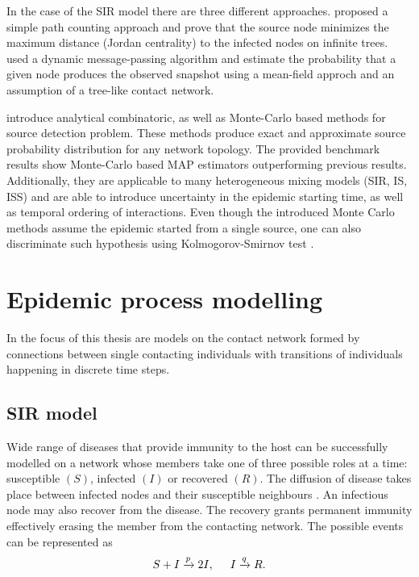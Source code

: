 \documentclass[times, utf8, diplomski]{fer}
\begin{document}
In the case of the SIR model there are three different approaches. \citet{Zhu} proposed a simple path counting approach and prove that the source node minimizes the maximum distance (Jordan centrality) to the infected nodes on infinite trees. \citet{Lohkov} used a dynamic message-passing algorithm and estimate the probability that a given node produces the observed snapshot using a mean-field approch and an assumption of a tree-like contact network.

\citet{Nino} introduce analytical combinatoric, as well as Monte-Carlo based methods for source detection problem. These methods produce exact and approximate source probability distribution for any network topology. The provided benchmark results show Monte-Carlo based MAP estimators outperforming previous results. Additionally, they are applicable to many heterogeneous mixing models (SIR, IS, ISS) and are able to introduce uncertainty in the epidemic starting time, as well as temporal ordering of interactions. 
Even though the introduced Monte Carlo methods assume the epidemic started from a single source, one can also discriminate such hypothesis using Kolmogorov-Smirnov test \cite{Nino}.


\chapter{Epidemic process modelling}

In the focus of this thesis are models on the contact network formed by connections between single contacting individuals with transitions of individuals happening in discrete time steps.

\section{SIR model}
Wide range of diseases that provide immunity to the host can be successfully modelled on a network whose members take 	one of three possible roles at a time: susceptible $(S)$, infected $(I)$ or recovered $(R)$. The diffusion of disease takes place between infected nodes and their susceptible neighbours . An infectious node may also recover from the disease. The recovery grants permanent immunity effectively erasing the member from the contacting network.  The possible events can be represented as 
\begin{equation}
S + I \xrightarrow{p} 2I,\hspace{5mm}  I \xrightarrow{q} R.
\label{transitionsSIR}
\end{equation}
\end{document}
